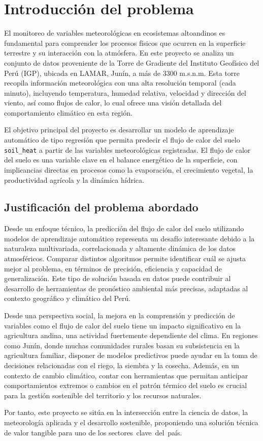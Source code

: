 

\section{Introducción del problema}

El monitoreo de variables meteorológicas en ecosistemas altoandinos es
fundamental para comprender los procesos físicos que ocurren en la superficie
terrestre y su interacción con la atmósfera. En este proyecto se analiza un
conjunto de datos proveniente de la Torre de Gradiente del Instituto Geofísico
del Perú (IGP), ubicada en LAMAR, Junín, a más de 3300 m.s.n.m. Esta torre
recopila información meteorológica con una alta resolución temporal (cada
minuto), incluyendo temperatura, humedad relativa, velocidad y dirección del
viento, así como flujos de calor, lo cual ofrece una visión detallada del
comportamiento climático en esta región.

El objetivo principal del proyecto es desarrollar un modelo de aprendizaje
automático de tipo regresión que permita predecir el flujo de calor del suelo
\verb!soil_heat! a partir de las variables meteorológicas registradas. El flujo de
calor del suelo es una variable clave en el balance energético de la superficie,
con implicancias directas en procesos como la evaporación, el crecimiento
vegetal, la productividad agrícola y la dinámica hídrica.

\subsection{Justificación del problema abordado}

Desde un enfoque técnico, la predicción del flujo de calor del suelo utilizando
modelos de aprendizaje automático representa un desafío interesante debido a la
naturaleza multivariada, correlacionada y altamente dinámica de los datos
atmosféricos. Comparar distintos algoritmos permite identificar cuál se ajusta
mejor al problema, en términos de precisión, eficiencia y capacidad de
generalización. Este tipo de solución basada en datos puede contribuir al
desarrollo de herramientas de pronóstico ambiental más precisas, adaptadas al
contexto geográfico y climático del Perú.

Desde una perspectiva social, la mejora en la comprensión y predicción de
variables como el flujo de calor del suelo tiene un impacto significativo en la
agricultura andina, una actividad fuertemente dependiente del clima. En regiones
como Junín, donde muchas comunidades rurales basan su subsistencia en la
agricultura familiar, disponer de modelos predictivos puede ayudar en la toma de
decisiones relacionadas con el riego, la siembra y la cosecha. Además, en un
contexto de cambio climático, contar con herramientas que permitan anticipar
comportamientos extremos o cambios en el patrón térmico del suelo es crucial
para la gestión sostenible del territorio y los recursos naturales.

Por tanto, este proyecto se sitúa en la intersección entre la ciencia de datos,
la meteorología aplicada y el desarrollo sostenible, proponiendo una solución
técnica de valor tangible para uno de los sectores clave del país.

